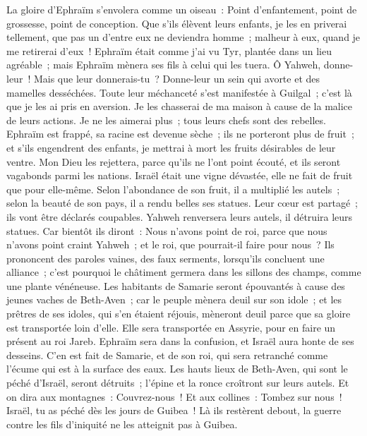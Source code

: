 \begin{multicols}{2}
La gloire d'Ephraïm s'envolera comme un oiseau~: Point d'enfantement, point de grossesse, point de conception.
Que s'ils élèvent leurs enfants, je les en priverai tellement, que pas un d'entre eux ne deviendra homme~; malheur à eux, quand je me retirerai d'eux~!
Ephraïm était comme j'ai vu Tyr, plantée dans un lieu agréable~; mais Ephraïm mènera ses fils à celui qui les tuera.
Ô Yahweh, donne-leur~! Mais que leur donnerais-tu~? Donne-leur un sein qui avorte et des mamelles desséchées.
Toute leur méchanceté s'est manifestée à Guilgal~; c'est là que je les ai pris en aversion. Je les chasserai de ma maison à cause de la malice de leurs actions. Je ne les aimerai plus~; tous leurs chefs sont des rebelles.
Ephraïm est frappé, sa racine est devenue sèche~; ils ne porteront plus de fruit~; et s'ils engendrent des enfants, je mettrai à mort les fruits désirables de leur ventre.
Mon Dieu les rejettera, parce qu'ils ne l'ont point écouté, et ils seront vagabonds parmi les nations.
\VerseOne{}Israël était une vigne dévastée, elle ne fait de fruit que pour elle-même. Selon l'abondance de son fruit, il a multiplié les autels~; selon la beauté de son pays, il a rendu belles ses statues.
Leur cœur est partagé~; ils vont être déclarés coupables. Yahweh renversera leurs autels, il détruira leurs statues.
Car bientôt ils diront~: Nous n'avons point de roi, parce que nous n'avons point craint Yahweh~; et le roi, que pourrait-il faire pour nous~?
Ils prononcent des paroles vaines, des faux serments, lorsqu'ils concluent une alliance~; c'est pourquoi le châtiment germera dans les sillons des champs, comme une plante vénéneuse.
Les habitants de Samarie seront épouvantés à cause des jeunes vaches de Beth-Aven~; car le peuple mènera deuil sur son idole~; et les prêtres de ses idoles, qui s'en étaient réjouis, mèneront deuil parce que sa gloire est transportée loin d'elle.
Elle sera transportée en Assyrie, pour en faire un présent au roi Jareb. Ephraïm sera dans la confusion, et Israël aura honte de ses desseins.
C'en est fait de Samarie, et de son roi, qui sera retranché comme l'écume qui est à la surface des eaux.
Les hauts lieux de Beth-Aven, qui sont le péché d'Israël, seront détruits~; l'épine et la ronce croîtront sur leurs autels. Et on dira aux montagnes~: Couvrez-nous~! Et aux collines~: Tombez sur nous~!
Israël, tu as péché dès les jours de Guibea~! Là ils restèrent debout, la guerre contre les fils d'iniquité ne les atteignit pas à Guibea.

\end{multicols}

